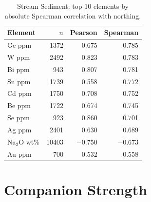 \begin{table}[H]
  \centering
  \caption{Stream Sediment: top-10 elements by absolute Spearman correlation with northing.}
  \label{tab:ss-northing}
  \begin{tabular}{lrrr}
    \toprule
    Element & $n$ & Pearson & Spearman \\
    \midrule
    Ge ppm        & 1372  & 0.675    & 0.785 \\
    W ppm         & 2492  & 0.823    & 0.783 \\
    Bi ppm        & 943   & 0.807    & 0.781 \\
    Sn ppm        & 1739  & 0.558    & 0.772 \\
    Cd ppm        & 1750  & 0.708    & 0.752 \\
    Be ppm        & 1722  & 0.674    & 0.745 \\
    Se ppm        & 923   & 0.860    & 0.701 \\
    Ag ppm        & 2401  & 0.630    & 0.689 \\
    Na$_2$O wt\%  & 10403 & $-$0.750 & $-$0.673 \\
    Au ppm        & 700   & 0.532    & 0.558 \\
    \bottomrule
  \end{tabular}
\end{table}


\section{Companion Strength}
\label{app:companion-strength}



